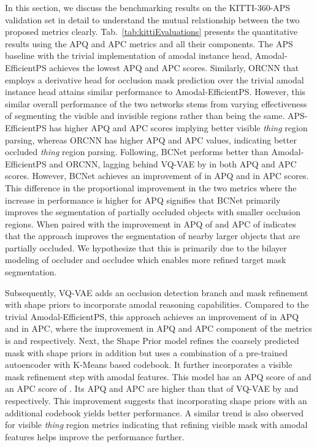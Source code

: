\documentclass[10pt,twocolumn,letterpaper]{article}
\newcommand{\tabref}[1]{Tab.~\ref{#1}}
\begin{document}
In this section, we discuss the benchmarking results on the KITTI-360-APS validation set in detail to understand the mutual relationship between the two proposed metrics clearly. \tabref{tab:kittiEvaluations} presents the quantitative results using the APQ and APC metrics and all their components. The APS baseline with the trivial implementation of amodal instance head, Amodal-EfficientPS achieves the lowest APQ and APC scores. Similarly, ORCNN that employs a derivative head for occlusion mask prediction over the trivial amodal instance head attains similar performance to Amodal-EfficientPS. However, this similar overall performance of the two networks stems from varying effectiveness of segmenting the visible and invisible regions rather than being the same. APS-EfficientPS has higher APQ and APC  scores implying better visible \textit{thing} region parsing, whereas ORCNN has higher APQ and APC  values, indicating better occluded \textit{thing} region parsing. Following, BCNet performs better than Amodal-EfficientPS and ORCNN, lagging behind VQ-VAE by  in both APQ and APC scores. However, BCNet achieves an improvement of  in APQ and  in APC scores. This difference in the proportional improvement in the two metrics where the increase in performance is higher for APQ signifies that BCNet primarily improves the segmentation of partially occluded objects with smaller occlusion regions. When paired with the improvement in APQ of  and APC of  indicates that the approach improves the segmentation of nearby larger objects that are partially occluded. We hypothesize that this is primarily due to the bilayer modeling of occluder and occludee which enables more refined target mask segmentation.

Subsequently, VQ-VAE adds an occlusion detection branch and mask refinement with shape priors to incorporate amodal reasoning capabilities. Compared to the trivial Amodal-EfficientPS, this approach achieves an improvement of  in APQ and  in APC, where the improvement in APQ and APC component of the metrics is  and  respectively. Next, the Shape Prior model refines the coarsely predicted mask with shape priors in addition but uses a combination of a pre-trained autoencoder with K-Means based codebook. It further incorporates a visible mask refinement step with amodal features. This model has an APQ score of  and an APC score of . Its APQ and APC are higher than that of VQ-VAE by  and  respectively. This improvement suggests that incorporating shape priors with an additional codebook yields better performance. A similar trend is also observed for visible \textit{thing} region metrics indicating that refining visible mask with amodal features helps improve the performance further.
\end{document}
